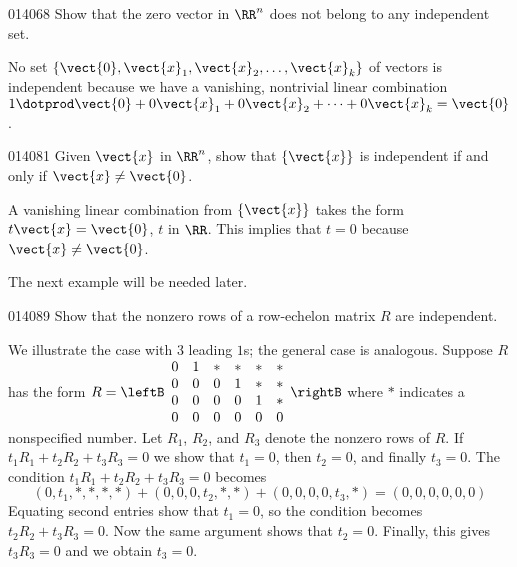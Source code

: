 \begin{example}{}{014068}
Show that the zero vector in $\RR^n$ does not belong to any independent set.

\begin{solution}
  No set $\{\vect{0}, \vect{x}_{1}, \vect{x}_{2}, \dots, \vect{x}_{k}\}$ of vectors is independent because we have a vanishing, nontrivial
  linear combination $1 \dotprod \vect{0} + 0\vect{x}_{1} + 0\vect{x}_{2} + \dots + 0\vect{x}_{k} = \vect{0}$.
\end{solution}
\end{example}

\begin{example}{}{014081}
Given $\vect{x}$ in $\RR^n$, show that $\{\vect{x}\}$ is independent if and only if $\vect{x} \neq \vect{0}$.

\begin{solution}
  A vanishing linear combination from $\{\vect{x}\}$ takes the form $t\vect{x} = \vect{0}$, $t$ in $\RR$. This implies that $t = 0$ because $\vect{x} \neq \vect{0}$.
\end{solution}
\end{example}

\noindent The next example will be needed later.


\begin{example}{}{014089}
Show that the nonzero rows of a row-echelon matrix $R$ are independent.

\begin{solution}
  We illustrate the case with 3 leading $1$s; the general case is analogous. Suppose $R$ has the form 
$R = 
\leftB \begin{array}{rrrrrr}
	0 & 1 & * & * & * & * \\
	0 & 0 & 0 & 1 & * & * \\
	0 & 0 & 0 & 0 & 1 & * \\
	0 & 0 & 0 & 0 & 0 & 0 \\
\end{array} \rightB$
 where $*$ indicates a nonspecified number. Let $R_{1}$, $R_{2}$, and $R_{3}$ denote the nonzero rows of $R$. If $t_{1}R_{1} + t_{2}R_{2} + t_{3}R_{3} = 0$ we show that $t_{1} = 0$, then $t_{2} = 0$, and finally $t_{3} = 0$. The condition $t_{1}R_{1} + t_{2}R_{2} + t_{3}R_{3} = 0$ becomes
\begin{equation*}
(0, t_1, *, *, *, *) + (0, 0, 0, t_2, *, *) + (0, 0, 0, 0, t_3, *) = (0, 0, 0, 0, 0, 0)
\end{equation*}
Equating second entries show that $t_{1} = 0$, so the condition becomes $t_{2}R_{2} + t_{3}R_{3} = 0$. Now the same argument shows that $t_{2} = 0$. Finally, this gives $t_{3}R_{3} = 0$ and we obtain $t_{3} = 0$.
\end{solution}
\end{example}

